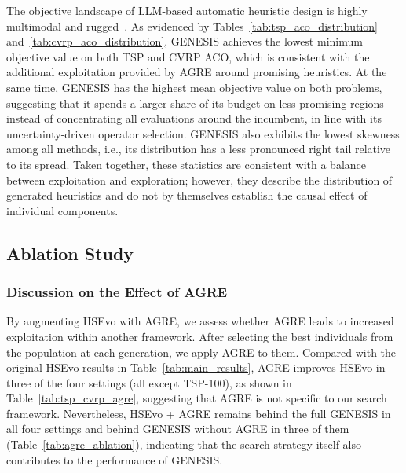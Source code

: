 \documentclass[sigconf,anonymous]{aamas}
\begin{document}
The objective landscape of LLM-based automatic heuristic design is highly multimodal and rugged~\cite{liu2025fitnesslandscapelargelanguage}. As evidenced by Tables~\ref{tab:tsp_aco_distribution} and~\ref{tab:cvrp_aco_distribution}, GENESIS achieves the lowest minimum objective value on both TSP and CVRP ACO, which is consistent with the additional exploitation provided by AGRE around promising heuristics. At the same time, GENESIS has the highest mean objective value on both problems, suggesting that it spends a larger share of its budget on less promising regions instead of concentrating all evaluations around the incumbent, in line with its uncertainty-driven operator selection. GENESIS also exhibits the lowest skewness among all methods, i.e., its distribution has a less pronounced right tail relative to its spread. Taken together, these statistics are consistent with a balance between exploitation and exploration; however, they describe the distribution of generated heuristics and do not by themselves establish the causal effect of individual components.


\subsection{Ablation Study}

\subsubsection{Discussion on the Effect of AGRE}

By augmenting HSEvo with AGRE, we assess whether AGRE leads to increased exploitation within another framework. After selecting the best individuals from the population at each generation, we apply AGRE to them. Compared with the original HSEvo results in Table~\ref{tab:main_results}, AGRE improves HSEvo in three of the four settings (all except TSP-100), as shown in Table~\ref{tab:tsp_cvrp_agre}, suggesting that AGRE is not specific to our search framework. Nevertheless, HSEvo + AGRE remains behind the full GENESIS in all four settings and behind GENESIS without AGRE in three of them (Table~\ref{tab:agre_ablation}), indicating that the search strategy itself also contributes to the performance of GENESIS.
\end{document}
